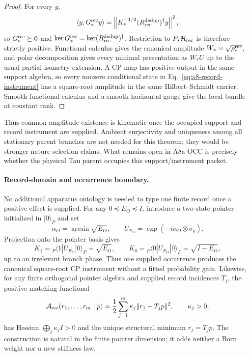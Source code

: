 \documentclass[11pt]{article}
\begin{document}
\begin{proof}
For every \(y\),
\[
 \langle y,G_*^{\rm rec}y\rangle
 =\left\|K_*^{-1/2}(R_{\rm rec}^{\rm dedup})^\dagger y\right\|^2,
\]
so \(G_*^{\rm rec}\succeq0\) and
\(\ker G_*^{\rm rec}=\ker(R_{\rm rec}^{\rm dedup})^\dagger\).  Restriction
to \(P_*\mathcal H_{\rm rec}\) is therefore strictly positive.  Functional
calculus gives the canonical amplitude \(W_*=\sqrt{\rho_*^{\rm rec}}\), and
polar decomposition gives every minimal presentation as \(W_*U\) up to the
usual partial-isometry extension.  A CP map has positive output in the same
support algebra, so every nonzero conditional state in
Eq.~\eqref{eq:a8-record-instrument} has a square-root amplitude in the same
Hilbert--Schmidt carrier.  Smooth functional calculus and a smooth horizontal
gauge give the local bundle at constant rank.
\end{proof}

Thus common-amplitude existence is kinematic once the occupied support and
record instrument are supplied.  Ambient surjectivity and uniqueness among
all stationary parent branches are not needed for this theorem; they would be
stronger nature-selection claims.  What remains open in A8a-OCC is precisely
whether the physical Tau parent occupies this support/instrument packet.

\paragraph{Record-domain and occurrence boundary.}
No additional apparatus ontology is needed to type one finite record once a
positive effect is supplied.  For any \(0\preceq E_O\preceq I\), introduce a
two-state pointer initialized in \(\lvert0\rangle_P\) and set
\begin{equation}
 \alpha_O=\arcsin\sqrt{E_O},
 \qquad
 U_{E_O}=\exp(-i\alpha_O\otimes\sigma_y).
 \label{eq:minimal-naimark-pointer}
\end{equation}
Projection onto the pointer basis gives
\begin{equation}
 K_1={}_P\!\langle1|U_{E_O}|0\rangle_P=\sqrt{E_O},
 \qquad
 K_0={}_P\!\langle0|U_{E_O}|0\rangle_P=\sqrt{I-E_O},
 \label{eq:minimal-square-root-instrument}
\end{equation}
up to an irrelevant branch phase.  Thus one supplied occurrence produces the
canonical square-root CP instrument without a fitted probability gain.
Likewise, for any finite orthogonal pointer algebra and supplied record
incidences \(T_j\), the positive matching functional
\begin{equation}
 \mathcal A_{\rm rec}(r_1,\ldots,r_m\mid p)
 ={1\over2}\sum_{j=1}^m\kappa_j\lVert r_j-T_jp\rVert^2,
 \qquad \kappa_j>0,
 \label{eq:positive-record-matching}
\end{equation}
has Hessian \(\bigoplus_j\kappa_j I>0\) and the unique structural minimum
\(r_j=T_jp\).  The construction is natural in the finite pointer dimension;
it adds neither a Born weight nor a new stiffness law.
\end{document}
